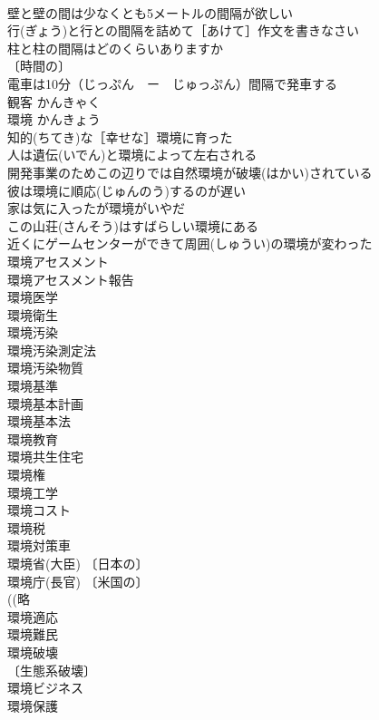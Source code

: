 \documentclass[8pt]{extreport}
\begin{document}
\begin{CJK}{UTF8}{min}
\\	壁と壁の間は少なくとも5メートルの間隔が欲しい 
\\	行(ぎょう)と行との間隔を詰めて［あけて］作文を書きなさい 
\\	柱と柱の間隔はどのくらいありますか 
\\	〔時間の〕
\\	電車は10分（じっぷん　ー　じゅっぷん）間隔で発車する 
\\	観客	かんきゃく	
\\	環境	かんきょう	
\\	知的(ちてき)な［幸せな］環境に育った 
\\	人は遺伝(いでん)と環境によって左右される 
\\	開発事業のためこの辺りでは自然環境が破壊(はかい)されている 
\\	彼は環境に順応(じゅんのう)するのが遅い 
\\	家は気に入ったが環境がいやだ 
\\	この山荘(さんそう)はすばらしい環境にある 
\\	近くにゲームセンターができて周囲(しゅうい)の環境が変わった 
\\	環境アセスメント 
\\	環境アセスメント報告 
\\	環境医学 
\\	環境衛生 
\\	環境汚染 
\\	環境汚染測定法 
\\	環境汚染物質 
\\	環境基準 
\\	環境基本計画 
\\	環境基本法 
\\	環境教育 
\\	環境共生住宅 
\\	環境権 
\\	環境工学 
\\	環境コスト 
\\	環境税 
\\	環境対策車 
\\	環境省(大臣) 〔日本の〕
\\	環境庁(長官) 〔米国の〕
\\	((略
\\	環境適応 
\\	環境難民 
\\	環境破壊 
\\	〔生態系破壊〕
\\	環境ビジネス 
\\	環境保護 

\end{CJK}
\end{document}
